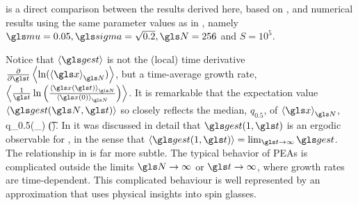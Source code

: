  is a direct comparison between the results derived
here, based on \cite{Derrida1980}, and numerical results using the same parameter 
values as in \cite{PetersKlein2013}, namely $\gmu=0.05, \gsigma=\sqrt{0.2}, \N=256$ and $S=10^5$.

Notice that $\ave{\gest}$ is not the (local)
time derivative $\frac{\partial}{\partial \t}\ave{\ln(\ave{\x}_\N)}$, but a time-average growth rate, $\ave{\frac{1}{\t}\ln\left( \frac{\ave{\x(\t)}_\N}{\ave{\x(0)}_\N}\right)}$. It is remarkable that the expectation value $\ave{\gest(\N,\t)}$ so closely reflects the
median, $q_{0.5}$, of $\ave{\x}_\N$, \ie
\be
q_{0.5}(\ave{\x(\t)}_\N) \approx \exp \left(\ave{\gest(\N,\t)}\t\right).
\ee
In \cite{PetersGell-Mann2016} it was discussed in detail that 
$\gest(1,\t)$ is an ergodic observable for , in the sense that 
$\ave{\gest(1,\t)}=\lim_{\t\to\infty} \gest$. The relationship in 
is far more subtle. The typical behavior of \GBM PEAs 
is complicated outside the limits $\N\to\infty$ or $\t\to\infty$, where growth rates are time-dependent. This complicated behaviour is well represented by an 
approximation that uses physical insights into spin glasses.

